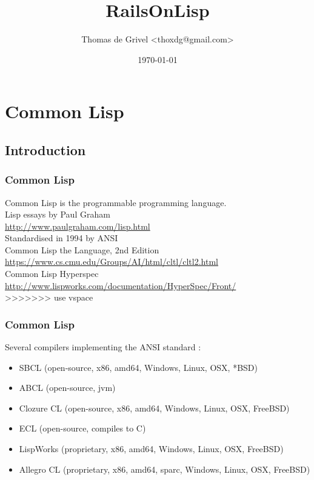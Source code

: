 \documentclass[8pt]{beamer}
\title{RailsOnLisp}
\author{Thomas de Grivel <thoxdg@gmail.com>}
\institute{http://kmx.io}
\date{\today}
\begin{document}
\begin{frame}
\titlepage
\end{frame}

\section{Common Lisp}
\subsection{Introduction}

\begin{frame}
  \frametitle{Common Lisp}
  Common Lisp is the programmable programming language. \\
  \vspace{1em}
  Lisp essays by Paul Graham \\
  \url{http://www.paulgraham.com/lisp.html} \\
  \vspace{1em}
  Standardised in 1994 by ANSI \\
  \vspace{1em}
  Common Lisp the Language, 2nd Edition \\
  \url{https://www.cs.cmu.edu/Groups/AI/html/cltl/cltl2.html} \\
  \vspace{1em}
  Common Lisp Hyperspec \\
  \url{http://www.lispworks.com/documentation/HyperSpec/Front/} \\
>>>>>>> use vspace
\end{frame}

\begin{frame}
  \frametitle{Common Lisp}
  Several compilers implementing the ANSI standard :
  \begin{itemize}
  \item SBCL (open-source, x86, amd64, Windows, Linux, OSX, *BSD)
  \item ABCL (open-source, jvm)
  \item Clozure CL (open-source, x86, amd64, Windows, Linux, OSX, FreeBSD)
  \item ECL (open-source, compiles to C)
  \item LispWorks (proprietary, x86, amd64, Windows, Linux, OSX, FreeBSD)
  \item Allegro CL (proprietary, x86, amd64, sparc, Windows, Linux, OSX, FreeBSD)
  \end{itemize}
\end{frame}
\end{document}
